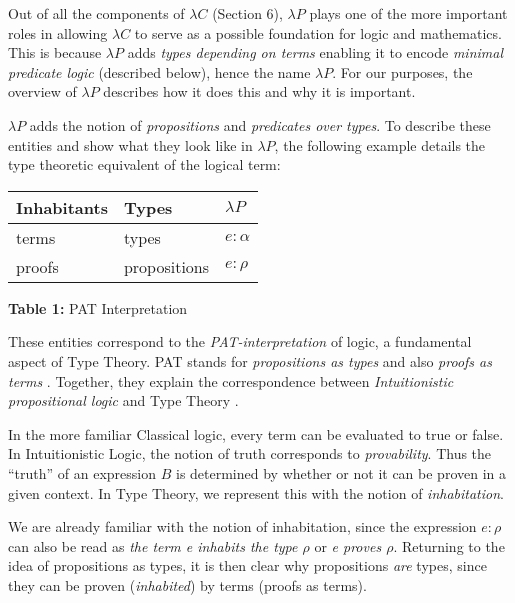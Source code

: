 \documentclass[9pt,preprint,nocopyrightspace,computermodern]{sigplanconf} %
\begin{document}
Out of all the components of \(\lambda C\) (Section 6), \(\lambda P\) plays one of
the more important roles in allowing \(\lambda C\) to serve as a possible foundation
for logic and mathematics. This is because \(\lambda P\) adds \textit{types depending on terms}
enabling it to encode \textit{minimal predicate logic} (described below), hence the
name \(\lambda P\). For our purposes, the overview of \(\lambda P\) describes how it does
this and why it is important.

\(\lambda P\) adds the notion of \textit{propositions} and \textit{predicates over types}.
To describe these entities and show what they look like in \(\lambda P\), the following example
details the type theoretic equivalent of the logical term:
\begin{center}
  \begin{tabu} {  X[c] | X[c] || X[c]  }
    \textbf{Inhabitants} & \textbf{Types} & \textbf{\(\lambda P\)} \\[0.05cm]
    \hline
    terms  & types & \(e : \alpha\) \\[0.05cm]
    \hline
    proofs & propositions & \(e : \rho\) \\[0.05cm]
  \end{tabu}\par\smallskip
  \textbf{Table 1:} PAT Interpretation
\end{center}
These entities correspond to the \textit{PAT-interpretation} of logic, a fundamental
aspect of Type Theory. PAT stands for \textit{propositions as types} and also
\textit{proofs as terms} \cite{how}. Together, they explain the correspondence between
\textit{Intuitionistic propositional logic} and Type Theory \cite{lof}.

In the more familiar Classical logic, every term can be evaluated to true or false.
In Intuitionistic Logic, the notion of truth corresponds to \textit{provability}.
Thus the ``truth'' of an expression \(B\) is determined by whether or not it can be proven
in a given context. In Type Theory, we represent this with the notion of \textit{inhabitation}.

We are already familiar with the notion of inhabitation, since the expression \(e : \rho\) can
also be read as \textit{the term e inhabits the type \(\rho\)} or \textit{e proves \(\rho\)}.
Returning to the idea of propositions as types, it is then clear why propositions \textit{are}
types, since they can be proven (\textit{inhabited}) by terms (proofs as terms).
\end{document}
